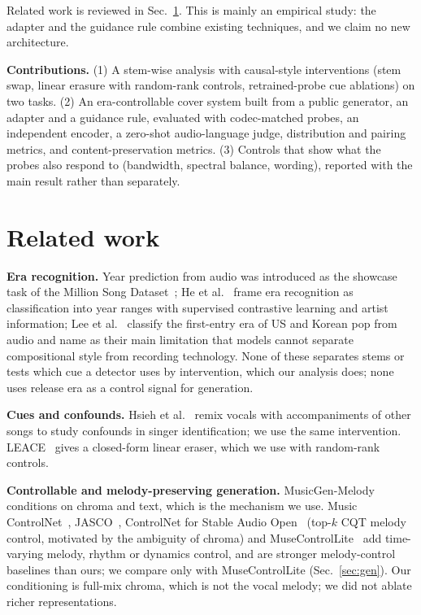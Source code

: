 \documentclass[10pt,twocolumn]{article}
\begin{document}
Related work is reviewed in Sec.~\ref{sec:rel}. This is mainly an empirical study: the adapter and the guidance rule combine existing techniques, and we claim no new architecture.

\textbf{Contributions.} (1) A stem-wise analysis with causal-style interventions (stem swap, linear erasure with random-rank controls, retrained-probe cue ablations) on two tasks. (2) An era-controllable cover system built from a public generator, an adapter and a guidance rule, evaluated with codec-matched probes, an independent encoder, a zero-shot audio-language judge, distribution and pairing metrics, and content-preservation metrics. (3) Controls that show what the probes also respond to (bandwidth, spectral balance, wording), reported with the main result rather than separately.

\section{Related work}\label{sec:rel}
\textbf{Era recognition.} Year prediction from audio was introduced as the showcase task of the Million Song Dataset~\cite{bertin2011msd}; He et al.~\cite{he2024era} frame era recognition as classification into year ranges with supervised contrastive learning and artist information; Lee et al.~\cite{lee2026era} classify the first-entry era of US and Korean pop from audio and name as their main limitation that models cannot separate compositional style from recording technology. None of these separates stems or tests which cue a detector uses by intervention, which our analysis does; none uses release era as a control signal for generation.

\textbf{Cues and confounds.} Hsieh et al.~\cite{hsieh2020confounds} remix vocals with accompaniments of other songs to study confounds in singer identification; we use the same intervention. LEACE~\cite{belrose2023leace} gives a closed-form linear eraser, which we use with random-rank controls.

\textbf{Controllable and melody-preserving generation.} MusicGen-Melody~\cite{copet2023musicgen} conditions on chroma and text, which is the mechanism we use. Music ControlNet~\cite{wu2023musiccontrolnet}, JASCO~\cite{tal2024jasco}, ControlNet for Stable Audio Open~\cite{hou2024editing} (top-$k$ CQT melody control, motivated by the ambiguity of chroma) and MuseControlLite~\cite{tsai2025musecontrollite} add time-varying melody, rhythm or dynamics control, and are stronger melody-control baselines than ours; we compare only with MuseControlLite (Sec.~\ref{sec:gen}). Our conditioning is full-mix chroma, which is not the vocal melody; we did not ablate richer representations.
\end{document}

